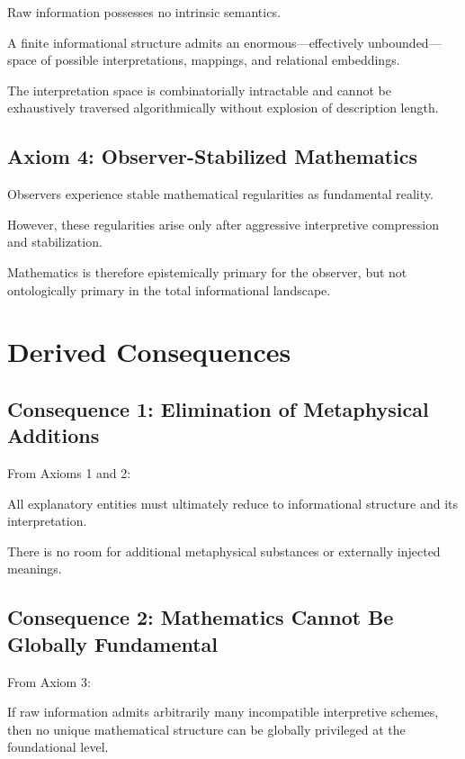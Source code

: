 Raw information possesses no intrinsic semantics.

A finite informational structure admits an enormous—effectively unbounded—space of possible interpretations, mappings, and relational embeddings.

The interpretation space is combinatorially intractable and cannot be exhaustively traversed algorithmically without explosion of description length.


\subsection*{Axiom 4: Observer-Stabilized Mathematics}

Observers experience stable mathematical regularities as fundamental reality.

However, these regularities arise only after aggressive interpretive compression and stabilization.

Mathematics is therefore epistemically primary for the observer,
but not ontologically primary in the total informational landscape.



\section{Derived Consequences}

\subsection{Consequence 1: Elimination of Metaphysical Additions}

From Axioms 1 and 2:

All explanatory entities must ultimately reduce to informational structure and its interpretation.

There is no room for additional metaphysical substances or externally injected meanings.



\subsection*{Consequence 2: Mathematics Cannot Be Globally Fundamental}

From Axiom 3:

If raw information admits arbitrarily many incompatible interpretive schemes,
then no unique mathematical structure can be globally privileged at the foundational level.

